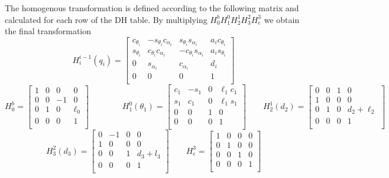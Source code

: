 \documentclass[a4paper,12pt]{article}
\renewcommand*{\a}{\alpha}
\renewcommand*{\t}{\theta}
\renewcommand*{\l}{\ell}
\begin{document}
\noindent The homogenous transformation is defined according to the following matrix and calculated for each row of the DH table. By multiplying $H^b_0H^0_1H^1_2H^2_3H^3_e$ we obtain the final transformation
\[
H^{i - 1}_{i}(q_i) = \begin{bmatrix}
    c_{\t_i} &  - s_{\t_i}c_{\a_i} & s_{\t_i}s_{\a_i} & a_i c_{\t_i} \\
    s_{\t_i} & c_{\t_i}c_{\a_i} &  - c_{\t_i}s_{\a_i} & a_i s_{\t_i} \\
        0    &     s_{\a_i}     &     c_{\a_i}     &     d_i     \\
        0    &         0        &         0        &     1        \\
\end{bmatrix}
\]
\[
H^b_0 = \begin{bmatrix}
    1 & 0 & 0 &    0    \\
    0 & 0 &  - 1 &    0    \\
    0 & 1 & 0 & \l_0 \\
    0 & 0 & 0 &    1    \\
\end{bmatrix}
\qquad
\qquad
H^0_1(\t_1) = \begin{bmatrix}
    c_1 &  - s_1 & 0 & \l_1 c_1 \\
    s_1 & c_1 & 0 & \l_1 s_1 \\
        0    &     0    & 1 &        0        \\
        0    &     0    & 0 &        1        \\
\end{bmatrix}
\qquad
H^1_2(d_2) = \begin{bmatrix}
    0 &  0 & 1 & 0 \\
    1 & 0 & 0 & 0 \\
        0    &    1    & 0 &        d_2+\l_2       \\
        0    &     0    & 0 &        1        \\
\end{bmatrix}
\]
\[
H^2_3(d_3) = \begin{bmatrix}
    0 & -1 & 0 & 0 \\
    1 & 0 & 0 & 0 \\
    0 & 0 & 1 & d_3 + l_3 \\
    0 & 0 & 0 & 1 \\
\end{bmatrix}
\qquad
H^3_e = \begin{bmatrix}
    1 & 0 & 0 & 0 \\
    0 & 1 & 0 & 0 \\
    0 & 0 & 1 & 0 \\
    0 & 0 & 0 & 1 \\
\end{bmatrix}
\]
\end{document}
